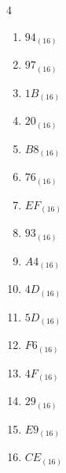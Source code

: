 \begin{multicols}{4}
\begin{enumerate}
  \item $94_{(16)}$

        \phantom{$=148$}

  \item $97_{(16)}$

        \phantom{$=151$}

  \item $1B_{(16)}$

        \phantom{$=27$}

  \item $20_{(16)}$

        \phantom{$=32$}

  \item $B8_{(16)}$

        \phantom{$=184$}

  \item $76_{(16)}$

        \phantom{$=118$}

  \item $EF_{(16)}$

        \phantom{$=239$}

  \item $93_{(16)}$

        \phantom{$=147$}

  \item $A4_{(16)}$

        \phantom{$=164$}

  \item $4D_{(16)}$

        \phantom{$=77$}

  \item $5D_{(16)}$

        \phantom{$=93$}

  \item $F6_{(16)}$

        \phantom{$=246$}

  \item $4F_{(16)}$

        \phantom{$=79$}

  \item $29_{(16)}$

        \phantom{$=41$}

  \item $E9_{(16)}$

        \phantom{$=233$}

\columnbreak %

  \item $CE_{(16)}$


\end{enumerate}
\end{multicols}
